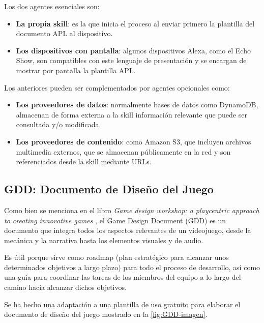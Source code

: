Los dos agentes esenciales son:
\begin{itemize}
	\item \textbf{La propia skill}: es la que inicia el proceso al enviar primero la plantilla del documento APL al dispositivo.
	\item \textbf{Los dispositivos con pantalla}: algunos dispositivos Alexa, como el Echo Show, son compatibles con este lenguaje de presentación y se encargan de mostrar por pantalla la plantilla APL. 
\end{itemize}

Los anteriores pueden ser complementados por agentes opcionales como: 
\begin{itemize}
	\item \textbf{Los proveedores de datos}: normalmente bases de datos como DynamoDB, almacenan de forma externa a la skill información relevante que puede ser consultada y/o modificada.
	\item \textbf{Los proveedores de contenido}: como Amazon S3, que incluyen archivos multimedia externos, que se almacenan públicamente en la red y son referenciados desde la skill mediante URLs. 
\end{itemize}

\subsection{GDD: Documento de Diseño del Juego}

Como bien se menciona en el libro \textit{Game design workshop: a playcentric approach to creating innovative games} \parencite{fullerton2008game}, el Game Design Document (GDD) es un documento que integra todos los aspectos relevantes de un videojuego, desde la mecánica y la narrativa hasta los elementos visuales y de audio. 

Es útil porque sirve como roadmap (plan estratégico para alcanzar unos determinados objetivos a largo plazo) para todo el proceso de desarrollo, así como una guía para coordinar las tareas de los miembros del equipo a lo largo del camino hacia alcanzar dichos objetivos.

Se ha hecho una adaptación a una plantilla de uso gratuito para elaborar el documento de diseño del juego mostrado en la \autoref{fig:GDD-imagen}. 

